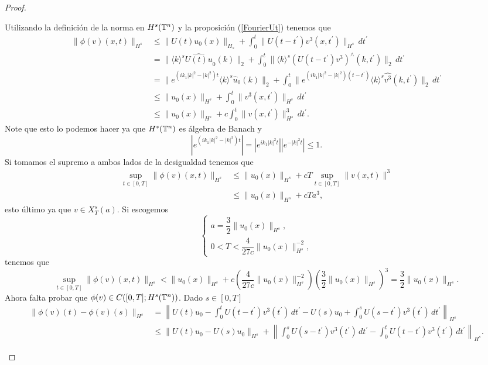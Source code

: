 \begin{proof}
\begin{itemize}
       Utilizando la definición de la norma en $H^s(\mathbb{T}^n)$ y la proposición (\ref{FourierUt}) tenemos que
       \begin{align*}
           \|\phi(v)(x,t)\|_{H^s}&\leq\|U(t)u_0(x)\|_{H_s}+\int_0^t\|U(t-t^\prime)v^3(x,t^\prime)\|_{H^s}\,dt^\prime\\
           &=\|\langle k\rangle^s\widehat{U(t)u}_0(k)\|_2+\int_0^t\|\langle k\rangle^s(U(t-t^\prime)v^3)^\wedge(k,t^\prime)\|_2\,dt^\prime\\
           &=\|e^{(ik_1|k|^2-|k|^2)t}\langle k\rangle^s\widehat{u}_0(k)\|_2+\int_0^t\|e^{(ik_1|k|^2-|k|^2)(t-t^\prime)}\langle k\rangle^s\widehat{v^3}(k,t^\prime)\|_2\,dt^\prime\\
           &\leq\|u_0(x)\|_{H^s}+\int_0^t\|v^3(x,t^\prime)\|_{H^s}\,dt^\prime\\
           &\leq\|u_0(x)\|_{H^s}+c\int_0^t\|v(x,t^\prime)\|^3_{H^s}\,dt^\prime.
       \end{align*}
       Note que esto lo podemos hacer ya que $H^s(\mathbb{T}^n)$ es álgebra de Banach y 
       $$\left|e^{(ik_1|k|^2-|k|^2)t}\right|=\left|e^{ik_1|k|^2t}\right|\left|e^{-|k|^2t}\right|\leq 1.$$
       Si tomamos el supremo a ambos lados de la desigualdad tenemos que
       \begin{align*}
           \sup_{t\in[0,T]}\|\phi(v)(x,t)\|_{H^s}&\leq\|u_0(x)\|_{H^s}+cT\sup_{t\in[0,T]}\|v(x,t)\|^3\\
           &\leq\|u_0(x)\|_{H^s}+cTa^3,
       \end{align*}
       esto último ya que $v\in X_T^s(a).$ Si escogemos
       $$\begin{cases}
           a=\dfrac{3}{2}\|u_0(x)\|_{H^s},\\
           0<T<\dfrac{4}{27c}\|u_0(x)\|^{-2}_{H^s},
       \end{cases}$$
       tenemos que
       $$\sup_{t\in[0,T]}\|\phi(v)(x,t)\|_{H^s}<\|u_0(x)\|_{H^s}+c\left(\dfrac{4}{27c}\|u_0(x)\|^{-2}_{H^s}\right)\left(\dfrac{3}{2}\|u_0(x)\|_{H^s}\right)^3 =\dfrac{3}{2}\|u_0(x)\|_{H^s}.$$
       Ahora falta probar que $\phi(v)\in C([0,T];H^s(\mathbb{T}^n))$. Dado $s\in[0,T]$
       \begin{align*}
           \|\phi(v)(t)-\phi(v)(s)\|_{H^s}&=\left\|U(t)u_0-\int_0^tU(t-t^\prime)v^3(t^\prime)\,dt^\prime-U(s)u_0+\int_0^sU(s-t^\prime)v^3(t^\prime)\,dt^\prime\right\|_{H^s}\\
           &\leq\|U(t)u_0-U(s)u_0\|_{H^s}+\left\|\int_0^sU(s-t^\prime)v^3(t^\prime)\,dt^\prime-\int_0^tU(t-t^\prime)v^3(t^\prime)\,dt^\prime\right\|_{H^s}.
       \end{align*}

\end{itemize}
\end{proof}
